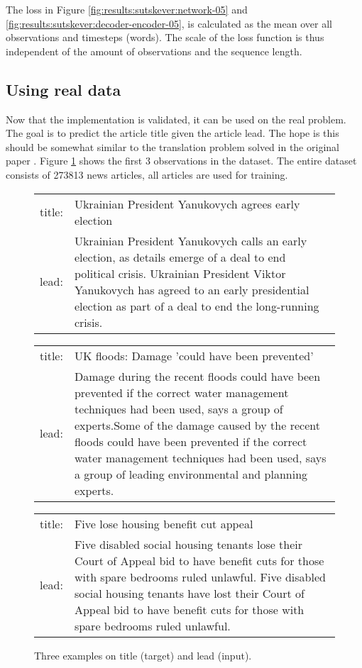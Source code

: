 The loss in Figure \ref{fig:results:sutskever:network-05} and \ref{fig:results:sutskever:decoder-encoder-05}, is calculated as the mean over all observations and timesteps (words). The scale of the loss function is thus independent of the amount of observations and the sequence length.

\subsection{Using real data}

Now that the implementation is validated, it can be used on the real problem. The goal is to predict the article title given the article lead. The hope is this should be somewhat similar to the translation problem solved in the original paper \cite{sutskever}. Figure \ref{fig:results:sutskever:example} shows the first 3 observations in the dataset. The entire dataset consists of 273813 news articles, all articles are used for training.

\begin{figure}[H]
\centering
\begin{tabular}{r|p{10cm}}
	title: & Ukrainian President Yanukovych agrees early election \\
	lead: & Ukrainian President Yanukovych calls an early election, as details emerge of a deal to end political crisis. Ukrainian President Viktor Yanukovych has agreed to an early presidential election as part of a deal to end the long-running crisis.
\end{tabular}
\mbox{}\vspace*{0.5cm}
\begin{tabular}{r|p{10cm}}
	title: & UK floods: Damage 'could have been prevented' \\
	lead: & Damage during the recent floods could have been prevented if the correct water management techniques had been used, says a group of experts.Some of the damage caused by the recent floods could have been prevented if the correct water management techniques had been used, says a group of leading environmental and planning experts.
\end{tabular}
\mbox{}\vspace*{0.5cm}
\begin{tabular}{r|p{10cm}}
	title: & Five lose housing benefit cut appeal \\
	lead: & Five disabled social housing tenants lose their Court of Appeal bid to have benefit cuts for those with spare bedrooms ruled unlawful. Five disabled social housing tenants have lost their Court of Appeal bid to have benefit cuts for those with spare bedrooms ruled unlawful.
\end{tabular}
\caption{Three examples on title (target) and lead (input).}
\label{fig:results:sutskever:example}
\end{figure}

